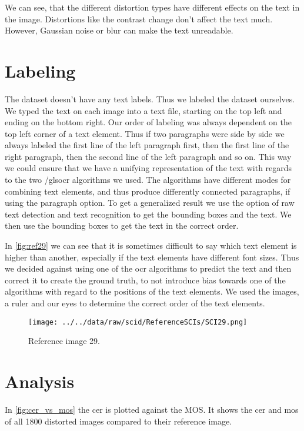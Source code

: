 We can see, that the different distortion types have different effects on the text in the image.
Distortions like the contrast change don't affect the text much.
However, Gaussian noise or blur can make the text unreadable.
\section{Labeling}
\label{sec:dataset_labeling}

The dataset doesn't have any text labels.
Thus we labeled the dataset ourselves.
We typed the text on each image into a text file, starting on the top left and ending on the bottom right.
Our order of labeling was always dependent on the top left corner of a text element.
Thus if two paragraphs were side by side we always labeled the first line of the left paragraph first, then the first line of the right paragraph, then the second line of the left paragraph and so on.
This way we could ensure that we have a unifying representation of the text with regards to the two /gls{ocr} algorithms we used.
The algorithms have different modes for combining text elements, and thus produce differently connected paragraphs, if using the paragraph option.
To get a generalized result we use the option of raw text detection and text recognition to get the bounding boxes and the text.
We then use the bounding boxes to get the text in the correct order.

In \autoref{fig:ref29} we can see that it is sometimes difficult to say which text element is higher than another, especially if the text elements have different font sizes.
Thus we decided against using one of the \gls{ocr} algorithms to predict the text and then correct it to create the ground truth, to not introduce bias towards one of the algorithms with regard to the positions of the text elements.
We used the images, a ruler and our eyes to determine the correct order of the text elements.

\begin{figure}
    \centering
    \texttt{[image: ../../data/raw/scid/ReferenceSCIs/SCI29.png]}
    \caption{Reference image 29.}
    \label{fig:ref29}
\end{figure}

\section{Analysis}
\label{sec:dataset_analysis}

In \autoref{fig:cer_vs_mos} the cer is plotted against the MOS.
It shows the \gls{cer} and \gls{mos} of all 1800 distorted images compared to their reference image.

